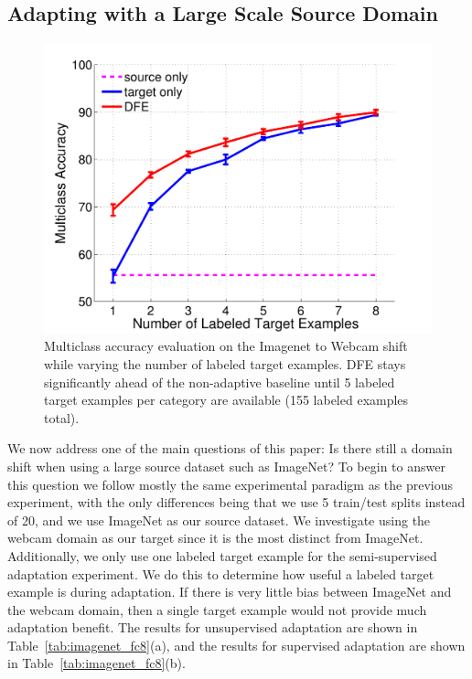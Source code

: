 




\subsection{Adapting with a Large Scale Source Domain}

\begin{figure}[h]
  \begin{center}
  \includegraphics[width=.48\textwidth]{figs/imagenet_webcam_vary_num_target_examples}
  \end{center}
  \caption{Multiclass accuracy evaluation on the Imagenet to Webcam shift while varying the number of labeled target examples. DFE stays significantly ahead of the non-adaptive baseline until 5 labeled target examples per category are available (155 labeled examples total).}
  \label{fig:vary_num_target}
\end{figure}

We now address one of the main questions of this paper: Is there still a domain shift when using a large source dataset such as ImageNet? To begin to answer this question we follow mostly the same experimental paradigm as the previous experiment, with the only differences being that we use 5 train/test splits instead of 20, and we use ImageNet as our source dataset.
We investigate using the webcam domain as our target since it is the most distinct from ImageNet. 
Additionally, we only use one labeled target example for the semi-supervised adaptation experiment. We do this to determine how useful a labeled target example is during adaptation. If there is very little bias between ImageNet and the webcam domain, then a single target example would not provide much adaptation benefit.
The results for unsupervised adaptation are shown in Table~\ref{tab:imagenet_fc8}(a), and the results for supervised adaptation are shown in Table~\ref{tab:imagenet_fc8}(b). %

%

